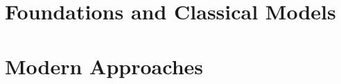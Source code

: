 \documentclass[12pt, a4paper, hidelinks, openright]{book}
\begin{document}
\part{Foundations and Classical Models} \label{part:part1}
\thispagestyle{empty}




\part{Modern Approaches} \label{part:part2}
\thispagestyle{empty}





\appendix



\printbibliography[heading=bibintoc]
\end{document}
